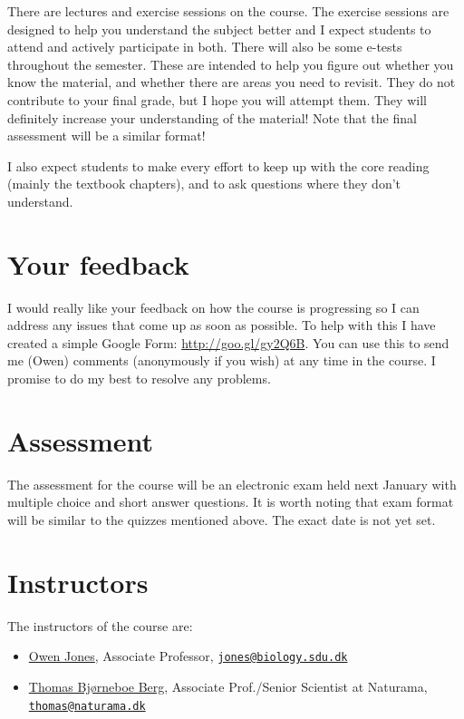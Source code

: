 \documentclass[
  a4paper]{book}
\providecommand{\tightlist}{%
  \setlength{\itemsep}{0pt}\setlength{\parskip}{0pt}}
\begin{document}
There are lectures and exercise sessions on the course. The exercise
sessions are designed to help you understand the subject better and I
expect students to attend and actively participate in both. There will
also be some e-tests throughout the semester. These are intended to help
you figure out whether you know the material, and whether there are
areas you need to revisit. They do not contribute to your final grade,
but I hope you will attempt them. They will definitely increase your
understanding of the material! Note that the final assessment will be a
similar format!

I also expect students to make every effort to keep up with the core
reading (mainly the textbook chapters), and to ask questions where they
don't understand.

\hypertarget{your-feedback}{%
\section{Your feedback}\label{your-feedback}}

I would really like your feedback on how the course is progressing so I
can address any issues that come up as soon as possible. To help with
this I have created a simple Google Form: \url{http://goo.gl/gy2Q6B}.
You can use this to send me (Owen) comments (anonymously if you wish) at
any time in the course. I promise to do my best to resolve any problems.

\hypertarget{assessment}{%
\section{Assessment}\label{assessment}}

The assessment for the course will be an electronic exam held next
January with multiple choice and short answer questions. It is worth
noting that exam format will be similar to the quizzes mentioned above.
The exact date is not yet set.

\hypertarget{instructors}{%
\section{Instructors}\label{instructors}}

The instructors of the course are:

\begin{itemize}
\tightlist
\item
  \href{https://portal.findresearcher.sdu.dk/en/persons/jones}{Owen
  Jones}, Associate Professor,
  \href{mailto:jones@biology.sdu.dk}{\nolinkurl{jones@biology.sdu.dk}}
\item
  \href{https://portal.findresearcher.sdu.dk/en/persons/thomasbb}{Thomas
  Bjørneboe Berg}, Associate Prof./Senior Scientist at Naturama,
  \href{mailto:thomas@naturama.dk}{\nolinkurl{thomas@naturama.dk}}
\end{itemize}
\end{document}

